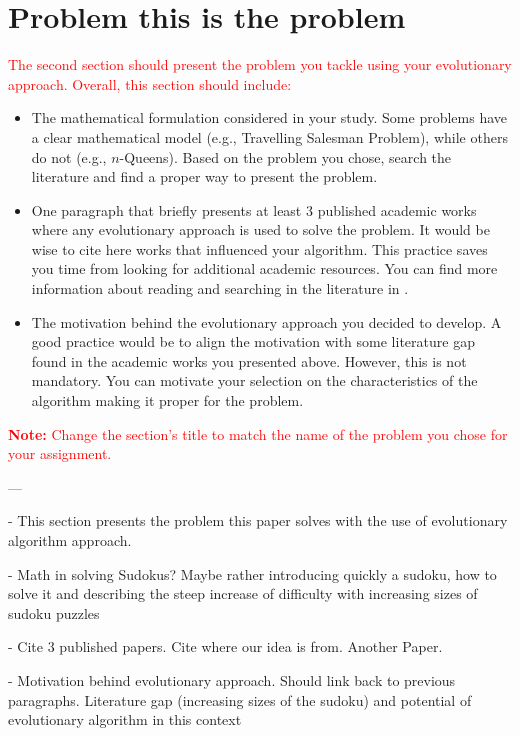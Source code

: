 \section{Problem this is the problem}
\label{sec:problem_description}

\textcolor{red}{The second section should present the problem you tackle using your evolutionary approach. Overall, this section should include:}

{\color{red}
\begin{itemize}
    \item The mathematical formulation considered in your study. Some problems have a clear mathematical model (e.g., Travelling Salesman Problem), while others do not (e.g., $n$-Queens). Based on the problem you chose, search the literature and find a proper way to present the problem.
    \item One paragraph that briefly presents at least 3 published academic works where any evolutionary approach is used to solve the problem. It would be wise to cite here works that influenced your algorithm. This practice saves you time from looking for additional academic resources. You can find more information about reading and searching in the literature in \cite{zobel2014reading}.
    \item The motivation behind the evolutionary approach you decided to develop. A good practice would be to align the motivation with some literature gap found in the academic works you presented above. However, this is not mandatory. You can motivate your selection on the characteristics of the algorithm making it proper for the problem.
\end{itemize}
}

\textcolor{red}{\textbf{Note:} Change the section's title to match the name of the problem you chose for your assignment.}

---

- This section presents the problem this paper solves with the use of evolutionary algorithm approach. 

- Math in solving Sudokus? Maybe rather introducing quickly a sudoku, how to solve it and describing the steep increase of difficulty with increasing sizes of sudoku puzzles

- Cite 3 published papers. Cite where our idea is from\cite{Mantere2007}. Another Paper\cite{Amil2019}.

- Motivation behind evolutionary approach. Should link back to previous paragraphs. Literature gap (increasing sizes of the sudoku) and potential of evolutionary algorithm in this context


